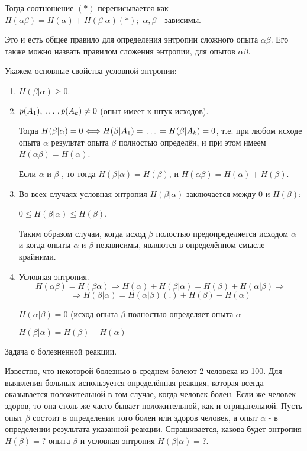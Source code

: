 ﻿\documentclass[a4paper,12pt]{report}
\begin{document}
	Тогда соотношение $(*)$ переписывается как $H(\alpha\beta) = H(\alpha) + H(\beta|\alpha) (*);$ $ \alpha, \beta \mbox{ - зависимы}$.

	Это и есть общее правило для определения энтропии сложного опыта $\alpha\beta$. Его также можно назвать правилом сложения энтропии, для  опытов $\alpha\beta$.
	
	Укажем основные свойства условной энтропии:


	\begin{enumerate}
	
	\item	$H(\beta|\alpha) \ge 0$.
	
	\item	$p(A_1), \,\ldots\,, p(A_k) \not = 0$ (опыт имеет к штук исходов).
		
		Тогда $H(\beta|\alpha) = 0 \Longleftrightarrow H(\beta|A_1) = \,\ldots\, = H(\beta|A_k) = 0$, т.е. при любом исходе опыта $\alpha$ результат опыта $\beta$ полностью определён, и при этом имеем 
		$H(\alpha\beta) = H(\alpha)$.
		
		Если $\alpha$ и $\beta$ , то тогда $H(\beta|\alpha) = H(\beta)$, и $H(\alpha\beta) = H(\alpha)+H(\beta)$.
	
	\item	Во всех случаях условная энтропия $H(\beta|\alpha)$ заключается между $0$ и $H(\beta)$:	
		
		$0 \le H(\beta|\alpha) \le H(\beta)$. 

		Таким образом случаи, когда исход $\beta$ полостью предопределяется исходом $\alpha$ и когда опыты $\alpha$ и $\beta$ независимы, являются в определённом смысле крайними.	

	\item 	Условная энтропия. 
		$$
		  H(\alpha\beta) = H(\beta\alpha) \Rightarrow 
		    H(\alpha) + H(\beta|\alpha) 
		     = H(\beta) + H(\alpha|\beta) \Rightarrow	     
		$$ $$ \Rightarrow
		    H(\beta|\alpha)
		     = H(\alpha|\beta)(.) + H(\beta) - H(\alpha)
		$$
		
		$H(\alpha|\beta) = 0$ (исход опыта $\beta$ полностью определяет опыта $\alpha$
		
		$H(\beta|\alpha) = H(\beta) - H(\alpha)$
		
	\end{enumerate}

	
		Задача о болезненной реакции. 
		
		Известно, что некоторой болезнью в среднем болеют 2 человека из 100. Для выявления больных используется определённая реакция, которая всегда оказывается положительной в том случае, когда человек болен. Если же человек здоров, то она столь же часто бывает положительной, как и отрицательной. Пусть опыт $\beta$ состоит в определении того болен или здоров человек, а опыт $\alpha$ - в определении результата указанной реакции. Спрашивается, какова будет энтропия $H(\beta) = ?$ опыта $\beta$ и условная энтропия $H(\beta|\alpha) = ?$.
	
\end{document}

